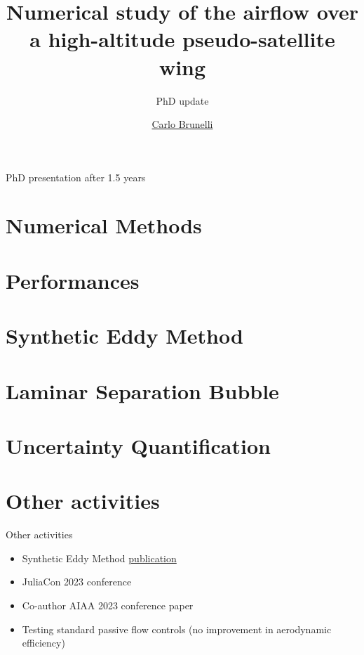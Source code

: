 \documentclass{beamer}
\title{Numerical study of the airflow over a high-altitude pseudo-satellite wing}
\subtitle{PhD update}
\author{\href{mailto:mail@carlobrunelli.com}{Carlo Brunelli}}
\begin{document}
\maketitle


\begin{frame}

PhD presentation after 1.5 years

\end{frame}

\section{Numerical Methods}



\section{Performances}


\section{Synthetic Eddy Method}



\section{Laminar Separation Bubble}


\section{Uncertainty Quantification}


\section{Other activities}
\begin{frame}{Other activities}
\begin{itemize}
	\item Synthetic Eddy Method \href{https://www.theoj.org/joss-papers/joss.05565/10.21105.joss.05565.pdf}{publication}
	\item JuliaCon 2023 conference
	\item Co-author AIAA 2023 conference paper
\end{itemize}

\begin{itemize}
	\item Testing standard passive flow controls (no improvement in aerodynamic efficiency)
\end{itemize}

\end{frame}
\end{document}
